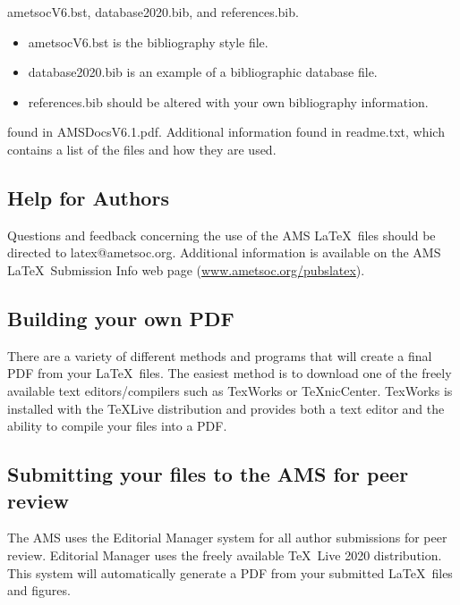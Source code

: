 \documentclass{ametsocV6.1}
\begin{document}
\begin{description}
ametsocV6.bst, database2020.bib, and references.bib.  

\begin{itemize}
\item
ametsocV6.bst is the bibliography style file. 

\item
database2020.bib is an example of a bibliographic database file.

\item
references.bib should be altered with your own bibliography information.  
\end{itemize}



\item[Documention:] found in AMSDocsV6.1.pdf. Additional information
found in
readme.txt, which contains a list of the files and how they are used.

\end{description}

\subsection{Help for Authors}
Questions and feedback concerning the use of the AMS \LaTeX\ files should be
directed to latex@ametsoc.org. Additional information is available on the AMS
\LaTeX\ Submission Info web page (\url{www.ametsoc.org/pubslatex}).



\appendix[C]

\subsection{Building your own PDF}
There are a variety of different methods and programs that will create a
final PDF from your \LaTeX\ files. The easiest method is to download one of
the freely available text editors/compilers such as TexWorks or TeXnicCenter.
TexWorks is installed with the TeXLive distribution and provides both a text
editor and the ability to compile your files into a PDF.

\subsection{Submitting your files to the AMS for peer review}
The AMS uses the Editorial Manager system for all author submissions for
peer review. Editorial Manager uses the freely available \TeX\ Live 2020
distribution. This system will automatically generate a PDF from your
submitted \LaTeX\ files and figures.  
\end{document}
